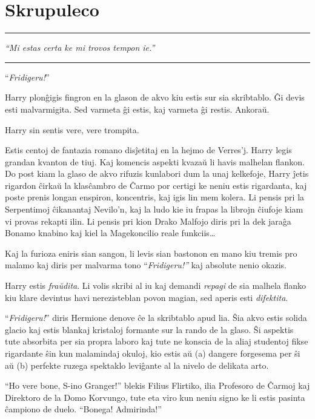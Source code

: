 \chapter{Skrupuleco}

\begin{center}\rule{3in}{0.4pt}\end{center}

\emph{``Mi estas certa ke mi trovos tempon ie.''}

\begin{center}\rule{3in}{0.4pt}\end{center}

``\emph{Fridigeru!}''

Harry plonĝigis fingron en la glason de akvo kiu estis sur sia
skribtablo. Ĝi devis esti malvarmigita. Sed varmeta ĝi estis, kaj
varmeta ĝi restis. Ankoraŭ.

Harry sin sentis vere, vere trompita.

Estis centoj de fantazia romano disĵetitaj en la hejmo de
Verres'j. Harry legis grandan kvanton de tiuj. Kaj komencis aspekti
kvazaŭ li havis malhelan flankon. Do post kiam la glaso de akvo rifuzis
kunlabori dum la unaj kelkefoje, Harry ĵetis rigardon ĉirkaŭ la
klasĉambro de Ĉarmo por certigi ke neniu estis rigardanta, kaj poste
prenis longan enspiron, koncentris, kaj igis lin mem kolera. Li pensis
pri la Serpentimoj ĉikanantaj Nevilo'n, kaj la ludo kie iu frapas la
librojn ĉiufoje kiam vi provas rekapti ilin. Li pensis pri kion Drako
Malfojo diris pri la dek jaraĝa Bonamo knabino kaj kiel la
Magekoncilio reale funkciis\ldots

Kaj la furioza eniris sian sangon, li levis sian bastonon en mano kiu
tremis pro malamo kaj diris per malvarma tono ``\emph{Fridigeru!''}
kaj absolute nenio okazis.

Harry estis \emph{fraŭdita}. Li volis skribi al iu kaj demandi
\emph{repagi} de sia malhela flanko kiu klare devintus havi
nerezisteblan povon magian, sed aperis esti \emph{difektita}.

``\emph{Fridigeru!}'' diris Hermione denove ĉe la skribtablo apud
lia. Ŝia akvo estis solida glacio kaj estis blankaj kristaloj formante
sur la rando de la glaso. Ŝi aspektis tute absorbita per sia propra
laboro kaj tute ne konscia de la aliaj studentoj fikse rigardante ŝin
kun malamindaj okuloj, kio estis aŭ (a) dangere forgesema per ŝi aŭ
(b) perfekte ruzega spektaklo leviĝante al la nivelo de delikata arto.

``Ho vere bone, S-ino Granger!'' blekis Filius Flirtiko, ilia
Profesoro de Ĉarmoj kaj Direktoro de la Domo Korvungo, tute eta viro
kun neniu signo ke li estis pasinta ĉampiono de duelo. ``Bonega!
Admirinda!''

